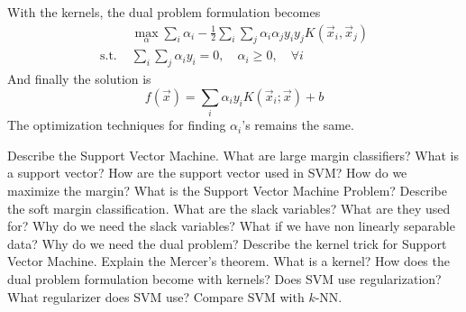 With the kernels, the dual problem formulation becomes
\begin{align*}
    &\max_\alpha \sum_i \alpha_i - \frac 1 2 \sum_i \sum_j \alpha_i \alpha_j y_i y_j K(\vec{x}_i, \vec{x}_j)\\
    \text{s.t. } &\sum_i \sum_j \alpha_i y_i = 0, \quad \alpha_i \geq 0, \quad \forall i
\end{align*}
And finally the solution is
\begin{equation}
    f(\vec{x}) = \sum_i \alpha_i y_i K(\vec{x}_i; \vec{x}) + b
\end{equation}
The optimization techniques for finding \(\alpha_i\)'s remains the same.

\newpage
\begin{exercise}[topsep=20pt, itemsep=10pt]
    \ex[!] Describe the Support Vector Machine.
    \ex What are large margin classifiers?
    \ex[!] What is a support vector? How are the support vector used in SVM?
    \ex How do we maximize the margin?
    \ex[!] What is the Support Vector Machine Problem?
    \ex Describe the soft margin classification.
    \ex What are the slack variables? What are they used for?
    \ex[!] Why do we need the slack variables?
    \ex What if we have non linearly separable data?
    \ex Why do we need the dual problem?
    \ex Describe the kernel trick for Support Vector Machine.
    \ex Explain the Mercer's theorem.
    \ex What is a kernel?
    \ex How does the dual problem formulation become with kernels?
    \ex[!] Does SVM use regularization? What regularizer does SVM use?
    \ex[!] Compare SVM with \(k\)-NN.
\end{exercise}
